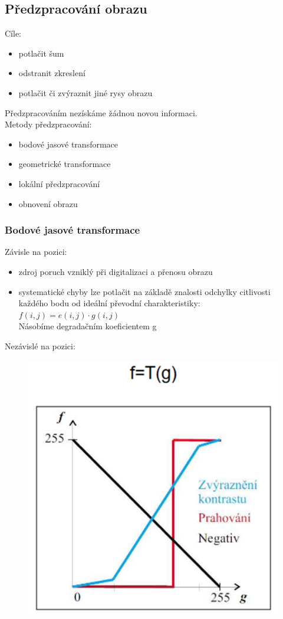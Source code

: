 \subsection{Předzpracování obrazu}
Cíle:
\begin{itemize}
    \item potlačit šum
    \item odstranit zkreslení
    \item potlačit či zvýraznit jiné rysy obrazu
\end{itemize}
Předzpracováním nezískáme žádnou novou informaci.\\
Metody předzpracování:
\begin{itemize}
    \item bodové jasové transformace
    \item geometrické transformace
    \item lokální předzpracování
    \item obnovení obrazu
\end{itemize}

\subsubsection{Bodové jasové transformace}
Závisle na pozici:
\begin{itemize}
    \item zdroj poruch vzniklý při digitalizaci a přenosu obrazu
    \item systematické chyby lze potlačit na základě  znalosti odchylky citlivosti každého bodu od ideální převodní charakteristiky:
          $f(i,j) = e(i,j)\cdot g(i,j)$\\
          Násobíme degradačním koeficientem g
\end{itemize}
\newpage
Nezávislé na pozici:
\begin{figure}[H]
    \includegraphics[scale = 0.13]{images/transf_krivka.png}
\end{figure}

